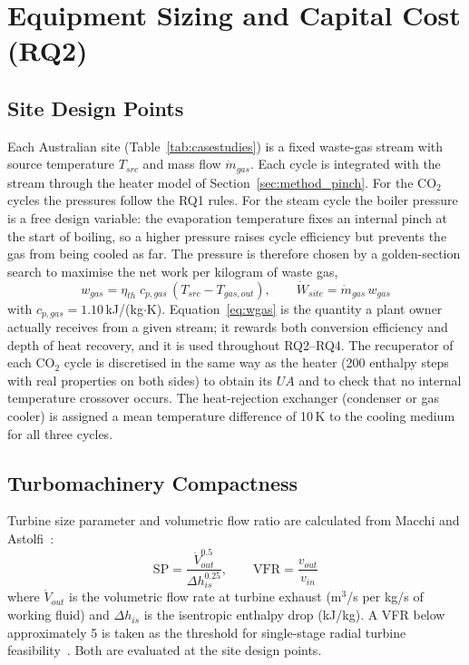 \section{Equipment Sizing and Capital Cost (RQ2)}
\label{sec:method_rq2}

\subsection{Site Design Points}
\label{sec:method_sitedesign}

Each Australian site (Table~\ref{tab:casestudies}) is a fixed waste-gas
stream with source temperature $T_{src}$ and mass flow $\dot{m}_{gas}$. Each
cycle is integrated with the stream through the heater model of
Section~\ref{sec:method_pinch}. For the CO$_2$ cycles the pressures follow the
RQ1 rules. For the steam cycle the boiler pressure is a free design variable:
the evaporation temperature fixes an internal pinch at the start of boiling,
so a higher pressure raises cycle efficiency but prevents the gas from being
cooled as far. The pressure is therefore chosen by a golden-section search to
maximise the net work per kilogram of waste gas,
\begin{equation}
w_{gas} = \eta_{th}\; c_{p,gas}\,\left(T_{src} - T_{gas,out}\right),
\qquad \dot{W}_{site} = \dot{m}_{gas}\, w_{gas}
\label{eq:wgas}
\end{equation}
with $c_{p,gas} = 1.10$\,kJ/(kg$\cdot$K). Equation~\eqref{eq:wgas} is the
quantity a plant owner actually receives from a given stream; it rewards
both conversion efficiency and depth of heat recovery, and it is used
throughout RQ2--RQ4. The recuperator of each CO$_2$ cycle is discretised in
the same way as the heater (200 enthalpy steps with real properties on both
sides) to obtain its $UA$ and to check that no internal temperature crossover
occurs. The heat-rejection exchanger (condenser or gas cooler) is assigned a
mean temperature difference of 10\,K to the cooling medium for all three
cycles.

\subsection{Turbomachinery Compactness}

Turbine size parameter and volumetric flow ratio are calculated from
Macchi and Astolfi~\cite{Macchi2017}:
\begin{equation}
\mathrm{SP} = \frac{\dot{V}_{out}^{0.5}}{\Delta h_{is}^{0.25}}, \qquad
\mathrm{VFR} = \frac{v_{out}}{v_{in}}
\label{eq:sp_vfr}
\end{equation}
where $\dot{V}_{out}$ is the volumetric flow rate at turbine exhaust (m$^3$/s
per kg/s of working fluid) and $\Delta h_{is}$ is the isentropic enthalpy
drop (kJ/kg). A VFR below approximately 5 is taken as the threshold for
single-stage radial turbine feasibility~\cite{Macchi2017}. Both are evaluated
at the site design points.

